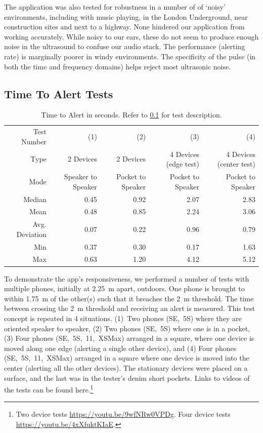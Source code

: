 \documentclass{article}
\begin{document}
The application was also tested for robustness in a number of of `noisy' environments, including with music playing, in the London Underground, near construction sites and next to a highway. None hindered our application from working accurately. While noisy to our ears, these do not seem to produce enough noise in the ultrasound to confuse our audio stack. The performance (alerting rate) is marginally poorer in windy environments. The specificity of the pulse (in both the time and frequency domains) helps reject most ultrasonic noise.


\subsection{Time To Alert Tests}
\label{sec:timeToAlert}

\begin{table}[tb]
\centering
\caption{Time to Alert in seconds. Refer to \cref{sec:timeToAlert} for test description.}
\begin{tabular}{@{}rrrrr@{}}
\toprule
Test Number & (1) & (2) & (3) & (4) \\
Type & 2 Devices & 2 Devices & 4 Devices (edge test) & 4 Devices (center test)\\
Mode & Speaker to Speaker & Pocket to Speaker & Pocket to Speaker & Pocket to Speaker\\ \midrule
Median & 0.45 & 0.92 & 2.07 & 2.83 \\
Mean & 0.48 & 0.85 & 2.24 & 3.06 \\
Avg. Deviation & 0.07 & 0.22 & 0.96 & 0.79 \\
Min & 0.37 & 0.30 & 0.17 & 1.63 \\
Max & 0.63 & 1.20 & 4.12 & 5.12 \\ \bottomrule
\end{tabular}
\label{tbl:timeToAlert}
\end{table}

To demonstrate the app's responsiveness, we performed a number of tests with multiple phones, initially at 2.25~m apart, outdoors. One phone is brought to within 1.75~m of the other(s) such that it breaches the 2~m threshold. The time between crossing the 2~m threshold and receiving an alert is measured. This test concept is repeated in 4 situations. (1)~Two phones (SE,~5S) where they are oriented speaker to speaker, (2) Two phones (SE,~5S) where one is in a pocket, (3) Four phones (SE,~5S,~11,~XSMax) arranged in a square, where one device is moved along one edge (alerting a single other device), and (4) Four phones (SE,~5S,~11,~XSMax) arranged in a square where one device is moved into the center (alerting all the other devices). The stationary devices were placed on a surface, and the last was in the tester's denim short pockets. Links to videos of the tests can be found here.\footnote{  Two device tests \url{https://youtu.be/9wfNRw0VPDg}. Four device tests \url{https://youtu.be/4xXfuktKIaE}. }
\end{document}
